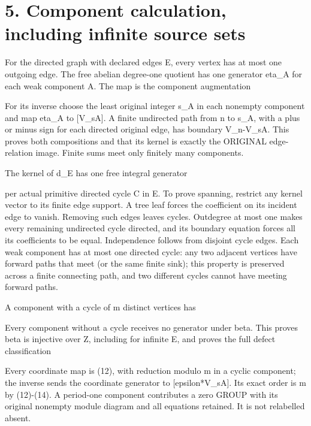 \section{5. Component calculation, including infinite source sets}

For the directed graph with declared edges E, every vertex has at most
one outgoing edge. The free abelian degree-one quotient has one
generator eta\_A for each weak component A. The map is the component
augmentation


For its inverse choose the least original integer s\_A in each nonempty
component and map eta\_A to {[}V\_sA{]}. A finite undirected path from n
to s\_A, with a plus or minus sign for each directed original edge, has
boundary V\_n-V\_sA. This proves both compositions and that its kernel
is exactly the ORIGINAL edge-relation image. Finite sums meet only
finitely many components.

The kernel of d\_E has one free integral generator


per actual primitive directed cycle C in E. To prove spanning, restrict
any kernel vector to its finite edge support. A tree leaf forces the
coefficient on its incident edge to vanish. Removing such edges leaves
cycles. Outdegree at most one makes every remaining undirected cycle
directed, and its boundary equation forces all its coefficients to be
equal. Independence follows from disjoint cycle edges. Each weak
component has at most one directed cycle: any two adjacent vertices have
forward paths that meet (or the same finite sink); this property is
preserved across a finite connecting path, and two different cycles
cannot have meeting forward paths.

A component with a cycle of m distinct vertices has


Every component without a cycle receives no generator under beta. This
proves beta is injective over Z, including for infinite E, and proves
the full defect classification


Every coordinate map is (12), with reduction modulo m in a cyclic
component; the inverse sends the coordinate generator to
{[}epsilon*V\_sA{]}. Its exact order is m by (12)-(14). A period-one
component contributes a zero GROUP with its original nonempty module
diagram and all equations retained. It is not relabelled absent.

